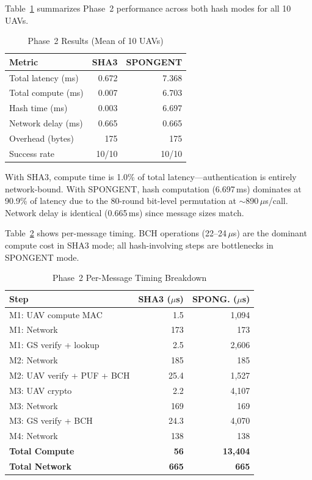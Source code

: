 \documentclass[conference]{IEEEtran}
\begin{document}
Table~\ref{tab:phase2} summarizes Phase~2 performance across both hash modes for all 10 UAVs.

\begin{table}[H]
\centering
\caption{Phase~2 Results (Mean of 10 UAVs)}
\label{tab:phase2}
\footnotesize
\begin{tabular}{@{}lrr@{}}
\toprule
\textbf{Metric} & \textbf{SHA3} & \textbf{SPONGENT} \\
\midrule
Total latency (ms) & 0.672 & 7.368 \\
Total compute (ms) & 0.007 & 6.703 \\
Hash time (ms) & 0.003 & 6.697 \\
Network delay (ms) & 0.665 & 0.665 \\
Overhead (bytes) & 175 & 175 \\
Success rate & 10/10 & 10/10 \\
\bottomrule
\end{tabular}
\end{table}

With SHA3, compute time is 1.0\% of total latency---authentication is entirely network-bound. With SPONGENT, hash computation (6.697\,ms) dominates at 90.9\% of latency due to the 80-round bit-level permutation at $\sim$890\,$\mu$s/call. Network delay is identical (0.665\,ms) since message sizes match.

Table~\ref{tab:phase2_breakdown} shows per-message timing. BCH operations (22--24\,$\mu$s) are the dominant compute cost in SHA3 mode; all hash-involving steps are bottlenecks in SPONGENT mode.

\begin{table}[H]
\centering
\caption{Phase~2 Per-Message Timing Breakdown}
\label{tab:phase2_breakdown}
\footnotesize
\begin{tabular}{@{}lrr@{}}
\toprule
\textbf{Step} & \textbf{SHA3 ($\mu$s)} & \textbf{SPONG. ($\mu$s)} \\
\midrule
M1: UAV compute MAC & 1.5 & 1,094 \\
M1: Network & 173 & 173 \\
M1: GS verify + lookup & 2.5 & 2,606 \\
M2: Network & 185 & 185 \\
M2: UAV verify + PUF + BCH & 25.4 & 1,527 \\
M3: UAV crypto & 2.2 & 4,107 \\
M3: Network & 169 & 169 \\
M3: GS verify + BCH & 24.3 & 4,070 \\
M4: Network & 138 & 138 \\
\midrule
\textbf{Total Compute} & \textbf{56} & \textbf{13,404} \\
\textbf{Total Network} & \textbf{665} & \textbf{665} \\
\bottomrule
\end{tabular}
\end{table}
\end{document}
